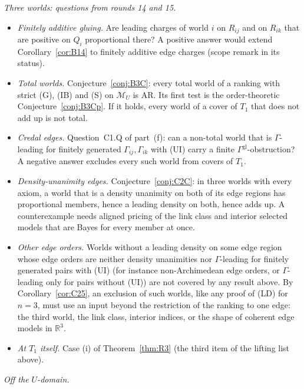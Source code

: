 \documentclass[11pt]{article}
\theoremstyle{definition}
\theoremstyle{remark}
\newcommand{\R}{\mathbb R}
\newcommand{\M}{\mathcal M}
\begin{document}
\emph{Three worlds: questions from rounds 14 and 15.}
\begin{itemize}[leftmargin=*]
\item \emph{Finitely additive gluing.} Are leading charges of world $i$ on $R_{ij}$ and on $R_{ik}$ that are positive on $Q_i$ proportional there? A positive answer would extend Corollary~\ref{cor:B14} to finitely additive edge charges (scope remark in its status).
\item \emph{Total worlds.} Conjecture~\ref{conj:B3C}: every total world of a ranking with strict (G), (IB) and (S) on $\M_U$ is AR. Its first test is the order-theoretic Conjecture~\ref{conj:B3Cp}. If it holds, every world of a cover of $T_1$ that does not add up is not total.
\item \emph{Credal edges.} Question~C1.Q of part~(f): can a non-total world that is $\Gamma$-leading for finitely generated $\Gamma_{ij},\Gamma_{ik}$ with (UI) carry a finite $\Gamma^{\mathrm{gl}}$-obstruction? A negative answer excludes every such world from covers of $T_1$.
\item \emph{Density-unanimity edges.} Conjecture~\ref{conj:C2C}: in three worlds with every axiom, a world that is a density unanimity on both of its edge regions has proportional members, hence a leading density on both, hence adds up. A counterexample needs aligned pricing of the link class and interior selected models that are Bayes for every member at once.
\item \emph{Other edge orders.} Worlds without a leading density on some edge region whose edge orders are neither density unanimities nor $\Gamma$-leading for finitely generated pairs with (UI) (for instance non-Archimedean edge orders, or $\Gamma$-leading only for pairs without (UI)) are not covered by any result above. By Corollary~\ref{cor:C25}, an exclusion of such worlds, like any proof of (LD) for $n=3$, must use an input beyond the restriction of the ranking to one edge: the third world, the link class, interior indices, or the shape of coherent edge models in $\R^3$.
\item \emph{At $T_1$ itself.} Case (i) of Theorem~\ref{thm:R3} (the third item of the lifting list above).
\end{itemize}
\emph{Off the $U$-domain.}
\end{document}
